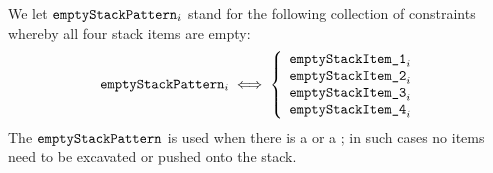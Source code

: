 We let $\texttt{empty}\texttt{StackPattern}_{i}$ stand for the following collection of constraints whereby all four stack items are empty:
\[
	\texttt{empty}\texttt{StackPattern}_{i}
	\iff
	\left\{
	\begin{array}{lr}
		\texttt{emptyStackItem\_1}_{i} \\
		\texttt{emptyStackItem\_2}_{i} \\
		\texttt{emptyStackItem\_3}_{i} \\
		\texttt{emptyStackItem\_4}_{i} \\
	\end{array}
	\right.
\]
The $\texttt{empty}\texttt{StackPattern}$ is used when there is a \suxSH{} or a \soxSH{}; in such cases no items need to be excavated or pushed onto the stack.